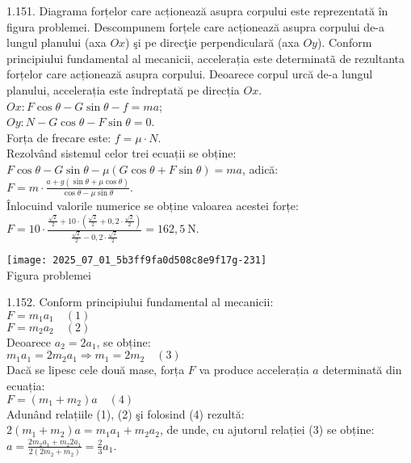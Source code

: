 1.151. Diagrama forțelor care acționează asupra corpului este reprezentată în figura problemei. Descompunem forțele care acționează asupra corpului de-a lungul planului (axa $Ox$) şi pe direcţie perpendiculară (axa $Oy$). Conform principiului fundamental al mecanicii, accelerația este determinatã de rezultanta forțelor care acționează asupra corpului. Deoarece corpul urcă de-a lungul planului, accelerația este îndreptată pe direcția $Ox$.\\ $Ox: F \cos \theta-G \sin \theta-f=m a$;\\ $Oy: N-G \cos \theta-F \sin \theta=0$.\\ Forța de frecare este: $f=\mu \cdot N$.\\ Rezolvând sistemul celor trei ecuații se obține:\\ $F \cos \theta-G \sin \theta-\mu(G \cos \theta+F \sin \theta)=m a$, adică:\\ $F=m \cdot \frac{a+g(\sin \theta+\mu \cos \theta)}{\cos \theta-\mu \sin \theta}$.\\ Înlocuind valorile numerice se obține valoarea acestei forțe:\\ $F=10 \cdot \frac{\frac{\sqrt{2}}{2}+10 \cdot\left(\frac{\sqrt{2}}{2}+0,2 \cdot \frac{\sqrt{2}}{2}\right)}{\frac{\sqrt{2}}{2}-0,2 \cdot \frac{\sqrt{2}}{2}}=162,5 \mathrm{~N}$.\\ \begin{center} \texttt{[image: 2025\_07\_01\_5b3ff9fa0d508c8e9f17g-231]}\\ Figura problemei \end{center}

1.152. Conform principiului fundamental al mecanicii:\\ $F=m_{1} a_{1} \quad (1)$\\ $F=m_{2} a_{2} \quad (2)$\\ Deoarece $a_{2}=2 a_{1}$, se obține:\\ $m_{1} a_{1}=2 m_{2} a_{1} \Rightarrow m_{1}=2 m_{2} \quad (3)$\\ Dacă se lipesc cele două mase, forța $F$ va produce accelerația $a$ determinată din ecuația:\\ $F=\left(m_{1}+m_{2}\right) a \quad (4)$\\ Adunând relațiile (1), (2) şi folosind (4) rezultă:\\ $2\left(m_{1}+m_{2}\right) a=m_{1} a_{1}+m_{2} a_{2}$, de unde, cu ajutorul relației (3) se obține:\\ $a=\frac{2 m_{2} a_{1}+m_{2} 2 a_{1}}{2\left(2 m_{2}+m_{2}\right)}=\frac{2}{3} a_{1}$.\\

